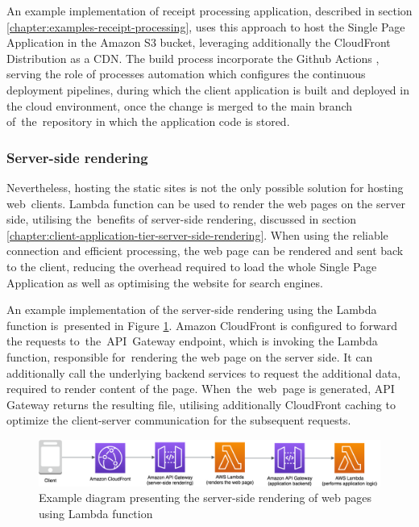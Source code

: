 An example implementation of receipt processing application, described in section \ref{chapter:examples-receipt-processing}, uses this approach to host the Single Page Application in the Amazon S3 bucket, leveraging additionally the CloudFront Distribution as a CDN.
The build process incorporate the Github Actions \cite{GithubAction}, serving the role of processes automation which configures the continuous deployment pipelines, during which the client application is built and deployed in the cloud environment, once the change is merged to the main branch of~the~repository in which the application code is stored.

\subsubsection{Server-side rendering}

Nevertheless, hosting the static sites is not the only possible solution for hosting web~clients.
Lambda function can be used to render the web pages on the server side, utilising the~benefits of server-side rendering, discussed in section \ref{chapter:client-application-tier-server-side-rendering}.
When using the reliable connection and efficient processing, the web page can be rendered and sent back to the client, reducing the overhead required to load the whole Single Page Application as well as optimising the website for search engines.

An example implementation of the server-side rendering using the Lambda function is~presented in Figure \ref{fig:pattern-client-server-side-rendering}.
Amazon CloudFront is configured to forward the requests to~the~API~Gateway endpoint, which is invoking the Lambda function, responsible for~rendering the web page on the server side.
It can additionally call the underlying backend services to request the additional data, required to render content of the page.
When~the~web~page is generated, API Gateway returns the resulting file, utilising additionally CloudFront caching to optimize the client-server communication for the subsequent requests.

\begin{figure}[H]
   \centering
   \includegraphics[width=1\textwidth]{assets/04-serverless-for-web-apps/serverSideRendering.png}
   \caption{Example diagram presenting the server-side rendering of web pages using Lambda function}
   \label{fig:pattern-client-server-side-rendering}
\end{figure}

